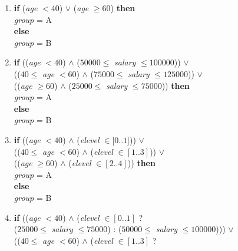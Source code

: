 \begin{figure}
\begin{enumerate}
\item
{\bf if} ({\it age} $< 40$) $\lor$ ({\it age} $\ge 60$) {\bf then}\\
\hspace*{1em} {\it group} = A\\
{\bf else}\\
\hspace*{1em} {\it group} = B\\
\item
{\bf if} (({\it age} $< 40$) $\land$ ($50000 \le$ {\it salary} $\le 100000$)) $\lor$\\
\hspace*{1em} (($40 \le$ {\it age} $< 60$) $\land$ ($75000 \le$ {\it salary} $\le 125000$)) $\lor$\\
\hspace*{1em} (({\it age} $\ge 60$) $\land$ ($25000 \le$ {\it salary} $\le 75000$)) {\bf then}\\
\hspace*{1em} {\it group} = A\\
{\bf else}\\
\hspace*{1em} {\it group} = B\\
\item
{\bf if} (({\it age} $< 40$) $\land$ ({\it elevel} $\in [0..1$])) $\lor$\\
\hspace*{1em} (($40 \le$ {\it age} $< 60$) $\land$ ({\it elevel} $\in [1..3]$)) $\lor$\\
\hspace*{1em} (({\it age} $\ge 60$) $\land$ ({\it elevel} $\in [2..4]$)) {\bf then}\\
\hspace*{1em} {\it group} = A\\
{\bf else}\\
\hspace*{1em} {\it group} = B \\
\item
{\bf if} (({\it age} $< 40$) $\land$ ({\it elevel} $\in [0..1]$ ?\\
\hspace*{2em} ($25000 \le$ {\it salary} $\le 75000$) : ($50000 \le$ {\it salary} $\le 100000$))) $\lor$\\
\hspace*{1em} (($40 \le$ {\it age} $< 60$) $\land$ ({\it elevel} $\in [1..3]$ ?\\

\end{enumerate}
\end{figure}

